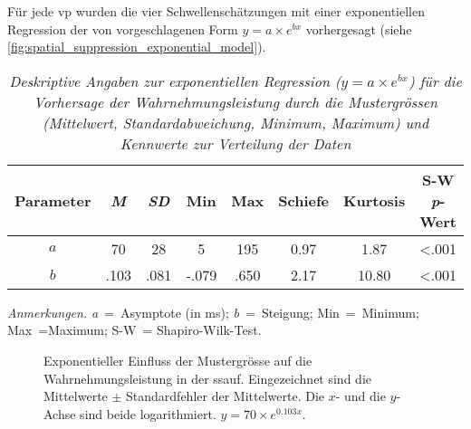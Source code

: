 \documentclass[11pt, twoside, a4paper]{book}		%
\begin{document}
Für jede \gls{vp} wurden die vier Schwellenschätzungen mit einer  exponentiellen Regression der von \citet{Melnick2013} vorgeschlagenen Form $y=a \times e^{bx}$ vorhergesagt (siehe \autoref{fig:spatial_suppression_exponential_model}).
\begin{table}[b]
	\centering
	\captionsetup{labelsep = none}
	\caption[Deskriptive Angaben zur ]{\newline  \textit{Deskriptive Angaben zur exponentiellen Regression ($y=a \times e^{bx}$) für die Vorhersage der Wahrnehmungsleistung durch die Mustergrössen (Mittelwert, Standardabweichung, Minimum, Maximum) und Kennwerte zur Verteilung der Daten} \vspace{.2cm}}
	\label{tab:spatial_suppression_exponential_model}
	\begin{adjustbox}{width=1\textwidth}
		\begin{threeparttable}
			\begin{tabular}{
					c
					S[table-format = 2.3]
					S[table-format = 2.3]
					S[table-format = 2.3]
					S[table-format = 3.3]
					S[table-format = 2.2]
					S[table-format = 2.2]
					S[table-format = <0.3, add-integer-zero=false]
				}
				\hline
				Parameter	& 	{\textit{M}}	&{\textit{SD}}	&	{Min}	&	{Max} 	&	{\textnormal{Schiefe}}	&	{\textnormal{Kurtosis}} & {S-W \textit{p}-Wert}\\
				\hline
				$a$			&		70			&	28			&	5		&	195		&	0.97					&	1.87					& 		<.001			\\
				$b$			&		.103		&	.081		&	-.079	&	.650	&	2.17					&	10.80					& 		<.001			\\
				\hline
			\end{tabular}

			\begin{tablenotes}[flushleft]
				\footnotesize				%
				\setlength{}	%
				\item \textit{Anmerkungen.} \textit{a}~=~Asymptote (in ms); \textit{b}~=~Steigung; Min~=~Minimum; Max~=Maximum; S-W~= Shapiro-Wilk-Test.
			\end{tablenotes}
		\end{threeparttable}
	\end{adjustbox}
\end{table}
\begin{figure}[t]
	\centering
	\begin{adjustbox}{width=1\textwidth}
		
	\end{adjustbox}
	\caption[Exponentielle Regression]{Exponentieller Einfluss der Mustergrösse auf die Wahrnehmungsleistung in der \gls{ssauf}. Eingezeichnet sind die Mittelwerte $\pm$ Standardfehler der Mittelwerte. Die $x$- und die $y$-Achse sind beide logarithmiert. $y=70 \times e^{0.103x}$.}
	\label{fig:spatial_suppression_exponential_model}
\end{figure}
\end{document}
